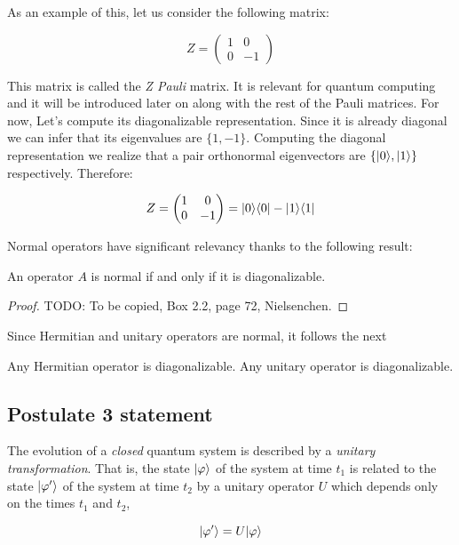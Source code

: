 \begin{exampleth}
	As an example of this, let us consider the following matrix:
	
	$$ Z = 
	\begin{pmatrix}
		1 & 0 \\
		0 & -1 
	\end{pmatrix}
	$$
	
	This matrix is called the \emph{Z Pauli} matrix. It is relevant for quantum computing and it will be introduced later on along with the rest of the Pauli matrices. For now, Let's compute its diagonalizable representation. Since it is already diagonal we can infer that its eigenvalues are $\{1, -1\}$. Computing the diagonal representation we realize that a pair orthonormal eigenvectors are $\{|0\rangle, |1\rangle\}$ respectively. Therefore:
	
	$$ Z = 
	\begin{pmatrix}
		1 & 0 \\
		0 & -1 
	\end{pmatrix} = 
	|0\rangle\langle0| - |1\rangle\langle1|
	$$
\end{exampleth}

Normal operators have significant relevancy thanks to the following result:

\begin{theorem}
\label{spectral-decomposition-theorem}
	An operator $A$ is normal if and only if it is diagonalizable.
\end{theorem}
\begin{proof}
	TODO: To be copied, Box 2.2, page 72, Nielsenchen.
\end{proof}

Since Hermitian and unitary operators are normal, it follows the next

\begin{corollary}
	Any Hermitian operator is diagonalizable. Any unitary operator is diagonalizable.
\end{corollary}


\subsection{Postulate 3 statement}
\label{postulate-3-section}

\begin{postulate}
	The evolution of a \emph{closed} quantum system is described by a \emph{unitary transformation}. That is, the state $|\varphi\rangle$ of the system at time $t_1$ is related to the state $|\varphi'\rangle$ of the system at time $t_2$ by a unitary operator $U$ which depends only on the times $t_1$ and $t_2$,
	
	$$ |\varphi'\rangle = U|\varphi\rangle $$
\end{postulate}

